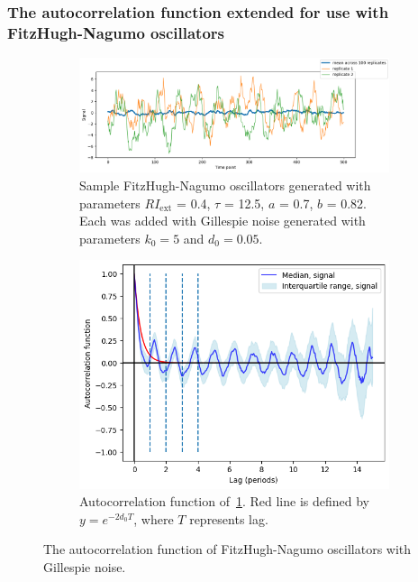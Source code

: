 \subsubsection{The autocorrelation function extended for use with FitzHugh-Nagumo oscillators}
\label{subsubsec:analysis-characterisation-acf-fhn}


\begin{figure}
  \centering
  \begin{subfigure}[t]{0.7\textwidth}
  \centering
    \includegraphics[width=\linewidth]{fhn_meanplot}
    \caption{
      Sample FitzHugh-Nagumo oscillators generated with parameters $RI_{\mathrm{ext}}$ = 0.4, $\tau$ = 12.5, $a$ = 0.7, $b$ = 0.82.
      Each was added with Gillespie noise generated with parameters $k_{0} = 5$ and $d_{0} = 0.05$.
    }
    \label{fig:acf-fhn-gillnoise-ts}
  \end{subfigure}

  \begin{subfigure}[t]{0.7\textwidth}
  \centering
    \includegraphics[width=\linewidth]{fhn_acf}
    \caption{
      Autocorrelation function of~\ref{fig:acf-fhn-gillnoise-ts}.
      Red line is defined by $y = e^{-2d_{0}T}$, where $T$ represents lag.
    }
    \label{fig:acf-fhn-gillnoise-acf}
  \end{subfigure}

  \caption{
    The autocorrelation function of FitzHugh-Nagumo oscillators with Gillespie noise.
  }
  \label{fig:acf-fhn}
\end{figure}

